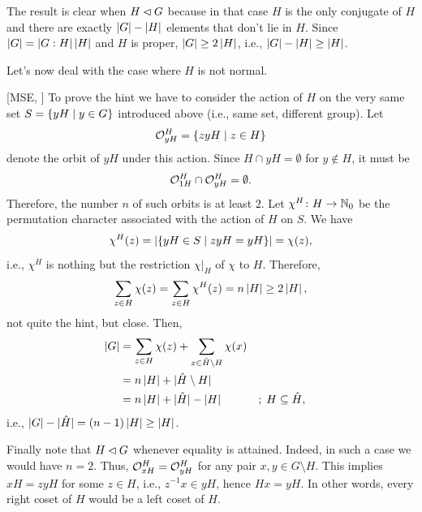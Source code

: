\begin{solution}
    The result is clear when $H\lhd G$ because in that case $H$ is the only conjugate of $H$ and there are exactly $\left\vert{G}\right\vert-\left\vert{H}\right\vert$ elements that don't lie in $H$. Since $\left\vert{G}\right\vert=\left\vert{G:H}\right\vert\left\vert{H}\right\vert$ and $H$ is proper, $\left\vert{G}\right\vert\ge2\left\vert{H}\right\vert$, i.e., $\left\vert{G}\right\vert-\left\vert{H}\right\vert\ge \left\vert{H}\right\vert$.

    Let's now deal with the case where $H$ is not normal.
    
    [MSE, \citeyear{1522816}] To prove the hint we have to consider the action of $H$ on the very same set $S=\{yH\mid y\in G\}$ introduced above (i.e., same set, different group). Let
    $$
        {\cal O}^H_{yH} = \{zyH\mid z\in H\}
    $$
    denote the orbit of $yH$ under this action. Since $H\cap yH=\emptyset$ for $y\notin H$, it must be
    $$
        {\cal O}^H_{1H}\cap{\cal O}^H_{yH}=\emptyset.
    $$
    Therefore, the number $n$ of such orbits is at least $2$. Let $\chi^H\colon H\to\mathbb{N}_0$ be the permutation character associated with the action of $H$ on $S$. We have
    $$
        \chi^H(z) = |\{yH\in S\mid zyH=yH\}| = \chi(z),
    $$
    i.e., $\chi^H$ is nothing but the restriction $\chi|_H$ of $\chi$ to $H$. Therefore,
    $$
        \sum_{z\in H}\chi(z) =\sum_{z\in H}\chi^H(z) = n\left\vert{H}\right\vert \ge 2\left\vert{H}\right\vert,
    $$
    not quite the hint, but close. Then,
    \begin{align*}
        \left\vert{G}\right\vert &=\sum_{z\in H}\chi(z) + \sum_{x\in\hat H\setminus H}\chi(x)\\
            &= n\left\vert{H}\right\vert + |\hat H\setminus H|\\
            &=n\left\vert{H}\right\vert + |\hat H| - \left\vert{H}\right\vert    &&;\; H\subseteq\hat H,
    \end{align*}
    i.e., $\left\vert{G}\right\vert- |\hat H| = (n-1)\left\vert{H}\right\vert\ge \left\vert{H}\right\vert$.
    
    Finally note that $H\lhd G$ whenever equality is attained. Indeed, in such a case we would have $n=2$. Thus,  ${\cal O}^H_{xH}={\cal O}^H_{yH}$ for any pair $x,y\in G\setminus H$. This implies $xH=zyH$ for some $z\in H$, i.e., $z^{-1}x\in yH$, hence $Hx=yH$. In other words, every right coset of $H$ would be a left coset of $H$.
\end{solution}

